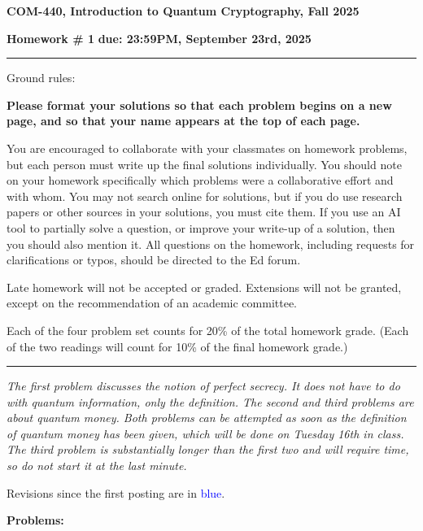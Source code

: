 \documentclass[12pt]{article}
\newcommand{\header}[1]{\begin{center} {\large\bf #1} \end{center}}
\begin{document}
\header{COM-440, Introduction to Quantum Cryptography, Fall 2025}
{\bf Homework \# 1} \hfill {\bf due: 23:59PM, September 23rd, 2025}


\medskip

\hrule

\medskip 

Ground rules: 

{\bf Please
  format your solutions so that each problem begins on a new page, and
  so that your name appears at the top of each page.}

You are encouraged to collaborate with your classmates on
homework problems, but each person must write up the final solutions
individually. You should note on your homework specifically which
problems were a collaborative effort and with whom. You may not search
online for solutions, but if you do use research papers or other
sources in your solutions, you must cite them. If you use an AI tool to 
partially solve a question, or improve your write-up of a solution, then 
you should also mention it. All questions on the homework, including requests for clarifications or typos, should be directed to the Ed forum.

Late homework will not be accepted or graded. Extensions will not be granted, except on the recommendation of an academic committee. 

Each of the four problem set counts for 20\% of the total homework grade. (Each of the two readings will count for 10\% of the final homework grade.)

\medskip

\hrule

 
\medskip

\emph{The first problem discusses the notion of perfect secrecy. It does not have to do with quantum information, only the definition. The second and third problems are about quantum money. Both problems can be attempted as soon as the definition of quantum money has been given, which will be done on Tuesday 16th in class. The third problem is substantially longer than the first two and will require time, so do not start it at the last minute.}

Revisions since the first posting are in \textcolor{blue}{blue}.

{\bf Problems:}
\end{document}
